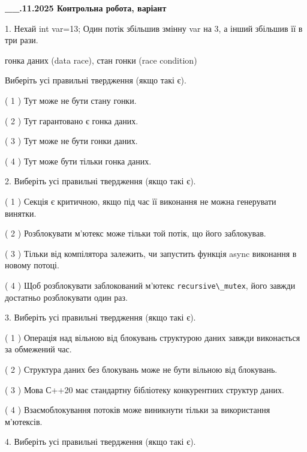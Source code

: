 \documentclass[12pt, ukrainian]{article}
\def\code#1{\Verb!#1!}
\begin{document}
\newpage
\begin {large}

\textbf{\_\_.11.2025 Контрольна робота, варіант  }\par


{
1. Нехай int var=13; Один потік збільшив змінну var на 3, а інший збільшив її в три рази.

гонка даних (data race), стан гонки (race condition)

Виберіть усі правильні твердження (якщо такі є).\par
\vspace{2mm}
( 1 ) Тут може не бути стану гонки.%

( 2 ) Тут гарантовано є гонка даних.%

( 3 ) Тут може не бути гонки даних.%

( 4 ) Тут може бути тільки гонка даних.%


2. Виберіть усі правильні твердження (якщо такі є).\par
\vspace{2mm}

( 1 ) Секція є критичною, якщо під час її виконання не можна генерувати винятки.%

( 2 ) Розблокувати м’ютекс може тільки той потік, що його заблокував.%

( 3 ) Тільки від компілятора залежить, чи запустить функція async виконання в новому потоці.%

( 4 ) Щоб розблокувати заблокований м’ютекс \code{recursive\_mutex}, його завжди достатньо розблокувати один раз.%


3. Виберіть усі правильні твердження (якщо такі є).\par
\vspace{2mm}

( 1 ) Операція над вільною від блокувань структурою даних завжди виконається за обмежений час.%

( 2 ) Структура даних без блокувань може не бути вільною від блокувань.%

( 3 ) Мова С++20 має стандартну бібліотеку конкурентних структур даних.%

( 4 ) Взаємоблокування потоків може виникнути тільки за використання м’ютексів.%


4. Виберіть усі правильні твердження (якщо такі є).\par
\vspace{2mm}

}
\end{large}
\end{document}

